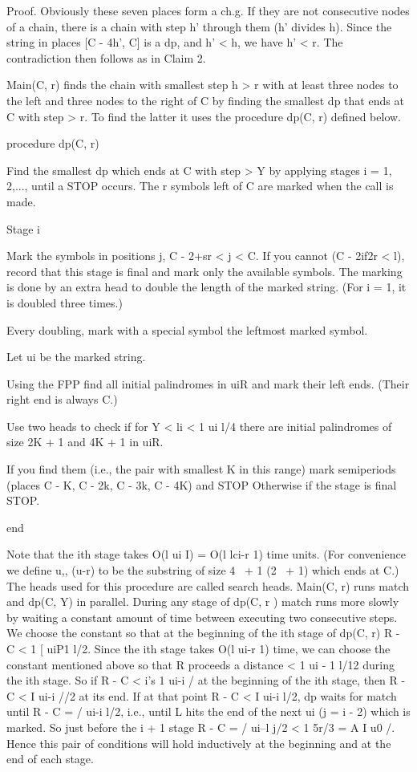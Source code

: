 \documentclass[11pt,a4paper]{report}
\begin{document}
Proof. Obviously these seven places form a ch.g. If they are not consecutive nodes
of a chain, there is a chain with step h’ through them (h’ divides h). Since the string in
places [C - 4h’, C] is a dp, and h’ < h, we have h’ < r. The contradiction then follows
as in Claim 2. 

Main(C, r) finds the chain with smallest step h > r with at least three nodes to the left
and three nodes to the right of C by finding the smallest dp that ends at C with step > r.
To find the latter it uses the procedure dp(C, r) defined below.

procedure dp(C, r)
\begin{myindentpar}{3cm}
Find the smallest dp which ends at C with step > Y by
applying stages i = 1, 2,..., until a STOP occurs. The r symbols
left of C are marked when the call is made.

Stage i

Mark the symbols in positions j, C - 2+sr < j < C. If you cannot
(C - 2if2r < l), record that this stage is final and mark only the
available symbols. The marking is done by an extra head to double
the length of the marked string. (For i = 1, it is doubled three times.)

Every doubling, mark with a special symbol the leftmost marked
symbol.

Let ui be the marked string.

Using the FPP find all initial palindromes in uiR and mark their
left ends. (Their right end is always C.)

Use two heads to check if for Y < li < 1 ui l/4 there are initial
palindromes of size 2K + 1 and 4K + 1 in uiR.

If you find them (i.e., the pair with smallest K in this range)
mark semiperiods (places C - K, C - 2k, C - 3k, C - 4K) and STOP
Otherwise if the stage is final STOP.

\end{myindentpar}

end

Note that the ith stage takes O(l ui I) = O(l lci-r 1) time units. (For convenience we
define u,, (u-r) to be the substring of size 4~ + 1 (2~ + 1) which ends at C.) The heads 
used for this procedure are called search heads. Main(C, r) runs match and dp(C, Y) in
parallel. During any stage of dp(C, r ) match runs more slowly by waiting a constant
amount of time between executing two consecutive steps. We choose the constant so that
at the beginning of the ith stage of dp(C, r) R - C < 1%
[ uiP1 l/2. Since the ith stage takes O(l ui-r 1) time, we can choose the constant mentioned
above so that R proceeds a distance < 1 ui - 1 l/12 during the ith stage. So if R - C <
i’s 1 ui-i / at the beginning of the ith stage, then R - C < I ui-i //2 at its end. If at that
point R - C < I ui-i l/2, dp waits for match until R - C = / ui-i l/2, i.e., until L hits
the end of the next ui (j = i - 2) which is marked. So just before the i + 1 stage
R - C = / ui--l j/2 < 1%
5r/3 = A I u0 /. Hence this pair of conditions will hold inductively at the beginning and
at the end of each stage.
\end{document}
